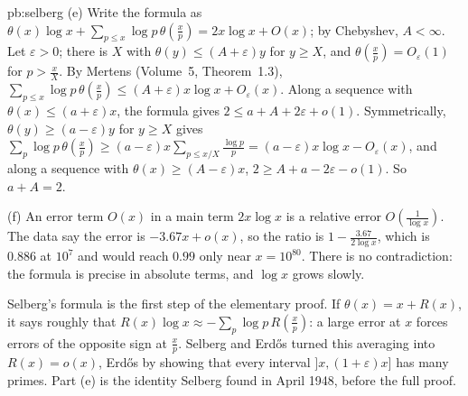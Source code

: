\begin{solution}{pb:selberg}
(e) Write the formula as $\theta(x)\log x+\sum_{p\le x}\log p\,\theta(\frac xp)=2x\log x+O(x)$; by Chebyshev, $A<\infty$. Let $\varepsilon>0$; there is $X$ with $\theta(y)\le(A+\varepsilon)y$ for $y\ge X$,
and $\theta(\frac xp)=O_\varepsilon(1)$ for $p>\frac xX$. By Mertens (Volume~5, Theorem~1.3), $\sum_{p\le x}\log p\,\theta(\frac xp)\le(A+\varepsilon)x\log x+O_\varepsilon(x)$. Along a sequence with
$\theta(x)\le(a+\varepsilon)x$, the formula gives $2\le a+A+2\varepsilon+o(1)$. Symmetrically, $\theta(y)\ge(a-\varepsilon)y$ for $y\ge X$ gives
$\sum_p\log p\,\theta(\frac xp)\ge(a-\varepsilon)x\sum_{p\le x/X}\frac{\log p}p=(a-\varepsilon)x\log x-O_\varepsilon(x)$, and along a sequence with $\theta(x)\ge(A-\varepsilon)x$, $2\ge A+a-2\varepsilon-o(1)$.
So $a+A=2$.

(f) An error term $O(x)$ in a main term $2x\log x$ is a relative error $O(\frac1{\log x})$. The data say the error is $-3.67x+o(x)$, so the ratio is $1-\frac{3.67}{2\log x}$, which is
$0.886$ at $10^7$ and would reach $0.99$ only near $x=10^{80}$. There is no contradiction: the formula is precise in absolute terms, and $\log x$ grows slowly.


\leads Selberg's formula is the first step of the elementary proof. If $\theta(x)=x+R(x)$, it says roughly that $R(x)\log x\approx-\sum_p\log p\,R(\frac xp)$: a large error at $x$ forces
errors of the opposite sign at $\frac xp$. Selberg and Erd\H os turned this averaging into $R(x)=o(x)$, Erd\H os by showing that every interval $]x,(1+\varepsilon)x]$ has many primes.
Part (e) is the identity Selberg found in April 1948, before the full proof.
\end{solution}

